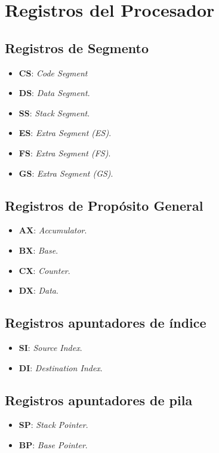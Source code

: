 \documentclass{article}
\begin{document}
\section*{Registros del Procesador}
\begin{multicols}{2}
    \subsection*{Registros de Segmento}
    \begin{itemize}
        \item \textbf{CS}: \textit{Code Segment}
        \item \textbf{DS}: \textit{Data Segment}.
        \item \textbf{SS}: \textit{Stack Segment}.
        \item \textbf{ES}: \textit{Extra Segment (ES)}.
        \item \textbf{FS}: \textit{Extra Segment (FS)}.
        \item \textbf{GS}: \textit{Extra Segment (GS)}.
    \end{itemize}
    \vphantom{}
    \columnbreak

    \subsection*{Registros de Prop\'{o}sito General}
    \begin{itemize}
        \item \textbf{AX}: \textit{Accumulator}.
        \item \textbf{BX}: \textit{Base}.
        \item \textbf{CX}: \textit{Counter}.
        \item \textbf{DX}: \textit{Data}.
    \end{itemize}
    \vphantom{}
\end{multicols}

\begin{multicols}{2}
    \subsection*{Registros apuntadores de \'{i}ndice}
    \begin{itemize}
        \item \textbf{SI}: \textit{Source Index}.
        \item \textbf{DI}: \textit{Destination Index}.
    \end{itemize}
    \vphantom{}
    \columnbreak

    \subsection*{Registros apuntadores de pila}
    \begin{itemize}
        \item \textbf{SP}: \textit{Stack Pointer}.
        \item \textbf{BP}: \textit{Base Pointer}.
    \end{itemize}
    \vphantom{}
\end{multicols}
\end{document}
